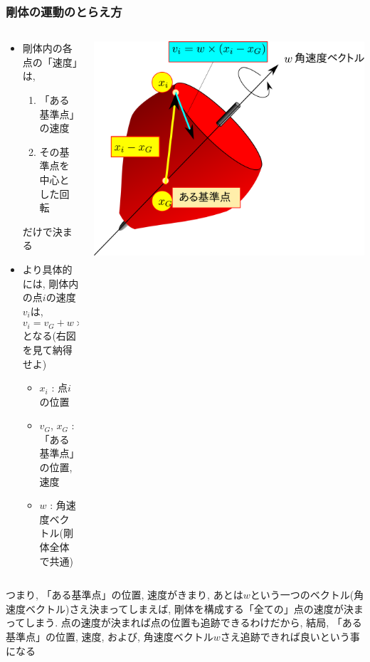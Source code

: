\documentclass[10pt,dvipdfmx]{beamer}
\newcommand{\aka}[1]{{\color{red}#1}}
\begin{document}
\begin{frame}
\frametitle{剛体の運動のとらえ方}
\begin{columns}
\begin{column}{0.6\textwidth}
\begin{itemize}
\item 剛体内の各点の「速度」は,
\begin{enumerate}
\item \aka{「ある基準点」の速度}
\item \aka{その基準点を中心とした回転}
\end{enumerate}
だけで決まる

\item より具体的には, 剛体内の点$i$の速度$v_i$は,
\aka{
  \begin{equation}
v_i = v_G + w \times (x_i - x_G) \label{eq:v_w_r}
  \end{equation}}
となる(右図を見て納得せよ)
\begin{itemize}
\item $x_i$ : 点$i$の位置
\item $v_G$, $x_G$ : 「ある基準点」の位置, 速度
\item $w$ : 角速度ベクトル\aka{(剛体全体で共通)}
\end{itemize}
\end{itemize}
\end{column}

\begin{column}{0.4\textwidth}
\includegraphics[width=\textwidth]{out/pdf/svg/v_w_r.pdf}
\end{column}
\end{columns}

\scriptsize{つまり, 「ある基準点」の位置, 速度がきまり,
あとは$w$という一つのベクトル(角速度ベクトル)さえ決まってしまえば,
剛体を構成する「全ての」点の速度が決まってしまう.
点の速度が決まれば点の位置も追跡できるわけだから,
結局, 「ある基準点」の位置, 速度, および, 
角速度ベクトル$w$さえ追跡できれば良いという事になる}


\end{frame}
\end{document}
